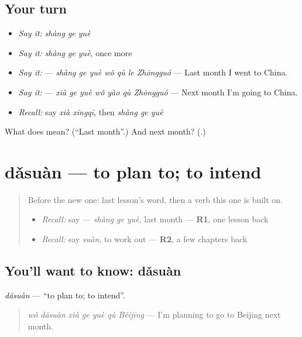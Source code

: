 \subsection*{Your turn}
\begin{itemize}
\raggedright
  \item \emph{Say it:} \emph{shàng ge yuè}
  \item \emph{Say it:} \emph{shàng ge yuè}, once more
  \item \emph{Say it:}  — \emph{shàng ge yuè wǒ qù le Zhōngguó} — Last month I went to China.
  \item \emph{Say it:}  — \emph{xià ge yuè wǒ yào qù Zhōngguó} — Next month I'm going to China.
  \item \emph{Recall:} say \emph{xià xīngqī}, then \emph{shàng ge yuè}
\end{itemize}

\begin{tcolorbox}[breakable,colback=teal!4,colframe=teal!35!black,title={Before you move on}]
What does  mean? (\textquotedblleft{}Last month\textquotedblright{}.) And next month? (\textbf{}.)
\end{tcolorbox}
\section[dǎsuàn]{dǎsuàn — to plan to; to intend}

\label{lesson:ZH-C148-dasuan}



\begin{quote}
Before the new one: last lesson's word, then a verb this one is built on.

\begin{itemize}
\raggedright
  \item \emph{Recall:} say  — \emph{shàng ge yuè}, last month — \textbf{R1}, one lesson back
  \item \emph{Recall:} say \emph{suàn}, to work out — \textbf{R2}, a few chapters back
\end{itemize}
\end{quote}

\subsection*{You'll want to know: dǎsuàn}
\emph{dǎsuàn} — \textquotedblleft{}to plan to; to intend\textquotedblright{}.

\begin{quote}
\emph{wǒ dǎsuàn xià ge yuè qù Běijīng} — I'm planning to go to Beijing next month.
\end{quote}

